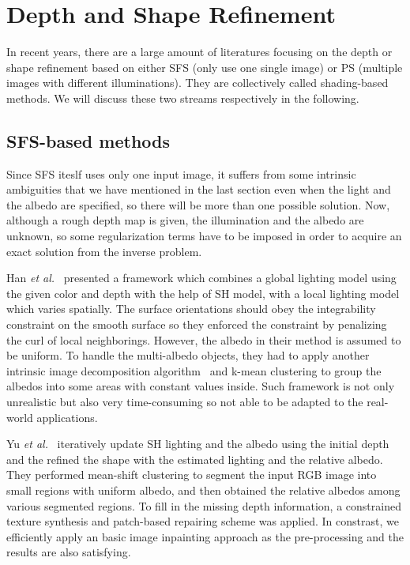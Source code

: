  

\section{Depth and Shape Refinement}

In recent years, there are a large amount of literatures focusing on the depth or shape refinement based on either SFS (only use one single image) or PS (multiple images with different illuminations).
They are collectively called shading-based methods.
We will discuss these two streams respectively in the following.
\subsection{SFS-based methods}
Since SFS iteslf uses only one input image, it suffers from some intrinsic ambiguities that we have mentioned in the last section even when the light and the albedo are specified, so there will be more than one possible solution.
Now, although a rough depth map is given, the illumination and the albedo are unknown, so some regularization terms have to be imposed in order to acquire an exact solution from the inverse problem.

Han \emph{et al.}~\cite{han2013high} presented a framework which combines a global lighting model using the given color and depth with the help of SH model, with a local lighting model which varies spatially. 
The surface orientations should obey the integrability constraint on the smooth surface so they enforced the constraint by penalizing the curl of local neighborings.
However, the albedo in their method is assumed to be uniform.
To handle the multi-albedo objects, they had to apply another intrinsic image decomposition algorithm~\cite{barron2011high} and k-mean clustering to group the albedos into some areas with constant values inside.
Such framework is not only unrealistic but also very time-consuming so not able to be adapted to the real-world applications.

Yu \emph{et al.}~\cite{yu2013shading} iteratively update SH lighting and the albedo using the initial depth and the refined the shape with the estimated lighting and the relative albedo. 
They performed mean-shift clustering to segment the input RGB image into small regions with uniform albedo, and then obtained the relative albedos among various segmented regions. 
To fill in the missing depth information, a constrained texture synthesis and patch-based repairing scheme was applied.
In constrast, we efficiently apply an basic image inpainting approach as the pre-processing and the results are also satisfying.


